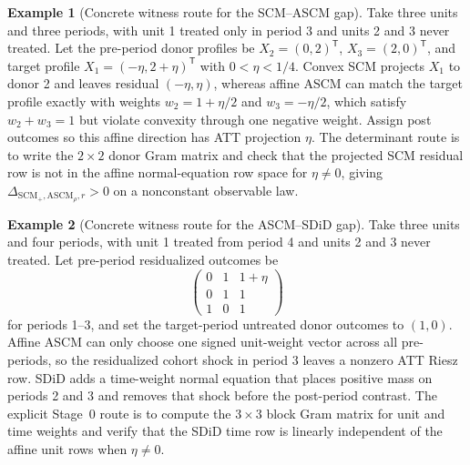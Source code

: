 \documentclass[11pt]{article}
\newcommand{\transpose}{\mathsf{T}}
\theoremstyle{definition}
\newtheorem{example}{Example}
\theoremstyle{plain}
\theoremstyle{remark}
\begin{document}
\begin{example}[Concrete witness route for the SCM--ASCM gap]\label{ex:scm-ascm}
Take three units and three periods, with unit 1 treated only in period 3 and
units 2 and 3 never treated. Let the pre-period donor profiles be
$X_2=(0,2)^\transpose$, $X_3=(2,0)^\transpose$, and target profile
$X_1=(-\eta,2+\eta)^\transpose$ with $0<\eta<1/4$. Convex SCM projects
$X_1$ to donor 2 and leaves residual $(-\eta,\eta)$, whereas affine ASCM can
match the target profile exactly with weights
$w_2=1+\eta/2$ and $w_3=-\eta/2$, which satisfy
$w_2+w_3=1$ but violate convexity through one negative weight. Assign post
outcomes so this affine direction has ATT projection $\eta$. The determinant
route is to write the $2\times2$ donor Gram matrix and check that the
projected SCM residual row is not in the affine normal-equation row space for
$\eta\ne0$, giving
$\Delta_{\mathrm{SCM}_{+},\mathrm{ASCM}_{\rho},r}>0$ on a nonconstant
observable law.
\end{example}

\begin{example}[Concrete witness route for the ASCM--SDiD gap]\label{ex:ascm-sdid}
Take three units and four periods, with unit 1 treated from period 4 and
units 2 and 3 never treated. Let pre-period residualized outcomes be
\[
  \begin{pmatrix}
  0&1&1+\eta\\
  0&1&1\\
  1&0&1
  \end{pmatrix}
\]
for periods 1--3, and set the target-period untreated donor outcomes to
$(1,0)$. Affine ASCM can only choose one signed unit-weight vector across all
pre-periods, so the residualized cohort shock in period 3 leaves a nonzero ATT
Riesz row. SDiD adds a time-weight normal equation that places positive mass
on periods 2 and 3 and removes that shock before the post-period contrast.
The explicit Stage~0 route is to compute the $3\times3$ block Gram matrix for
unit and time weights and verify that the SDiD time row is linearly independent
of the affine unit rows when $\eta\ne0$.
\end{example}
\end{document}
